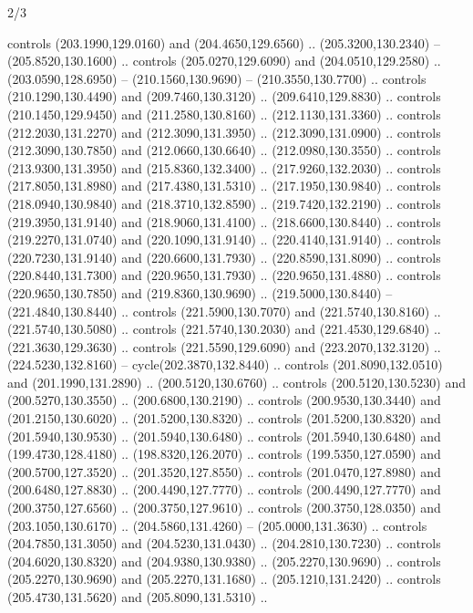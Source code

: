 \begin{flagdescription}{2/3}
\begin{scope}[xshift=0.5\flaglength,yshift=0.5\flagwidth,scale=\flagwidth/259.2]
\begin{scope}[y=0.8pt, x=0.8pt, yscale=-1,shift={(-243,-162)}]
      controls (203.1990,129.0160) and (204.4650,129.6560) .. (205.3200,130.2340) --
      (205.8520,130.1600) .. controls (205.0270,129.6090) and (204.0510,129.2580) ..
      (203.0590,128.6950) -- (210.1560,130.9690) -- (210.3550,130.7700) .. controls
      (210.1290,130.4490) and (209.7460,130.3120) .. (209.6410,129.8830) .. controls
      (210.1450,129.9450) and (211.2580,130.8160) .. (212.1130,131.3360) .. controls
      (212.2030,131.2270) and (212.3090,131.3950) .. (212.3090,131.0900) .. controls
      (212.3090,130.7850) and (212.0660,130.6640) .. (212.0980,130.3550) .. controls
      (213.9300,131.3950) and (215.8360,132.3400) .. (217.9260,132.2030) .. controls
      (217.8050,131.8980) and (217.4380,131.5310) .. (217.1950,130.9840) .. controls
      (218.0940,130.9840) and (218.3710,132.8590) .. (219.7420,132.2190) .. controls
      (219.3950,131.9140) and (218.9060,131.4100) .. (218.6600,130.8440) .. controls
      (219.2270,131.0740) and (220.1090,131.9140) .. (220.4140,131.9140) .. controls
      (220.7230,131.9140) and (220.6600,131.7930) .. (220.8590,131.8090) .. controls
      (220.8440,131.7300) and (220.9650,131.7930) .. (220.9650,131.4880) .. controls
      (220.9650,130.7850) and (219.8360,130.9690) .. (219.5000,130.8440) --
      (221.4840,130.8440) .. controls (221.5900,130.7070) and (221.5740,130.8160) ..
      (221.5740,130.5080) .. controls (221.5740,130.2030) and (221.4530,129.6840) ..
      (221.3630,129.3630) .. controls (221.5590,129.6090) and (223.2070,132.3120) ..
      (224.5230,132.8160) -- cycle(202.3870,132.8440) .. controls
      (201.8090,132.0510) and (201.1990,131.2890) .. (200.5120,130.6760) .. controls
      (200.5120,130.5230) and (200.5270,130.3550) .. (200.6800,130.2190) .. controls
      (200.9530,130.3440) and (201.2150,130.6020) .. (201.5200,130.8320) .. controls
      (201.5200,130.8320) and (201.5940,130.9530) .. (201.5940,130.6480) .. controls
      (201.5940,130.6480) and (199.4730,128.4180) .. (198.8320,126.2070) .. controls
      (199.5350,127.0590) and (200.5700,127.3520) .. (201.3520,127.8550) .. controls
      (201.0470,127.8980) and (200.6480,127.8830) .. (200.4490,127.7770) .. controls
      (200.4490,127.7770) and (200.3750,127.6560) .. (200.3750,127.9610) .. controls
      (200.3750,128.0350) and (203.1050,130.6170) .. (204.5860,131.4260) --
      (205.0000,131.3630) .. controls (204.7850,131.3050) and (204.5230,131.0430) ..
      (204.2810,130.7230) .. controls (204.6020,130.8320) and (204.9380,130.9380) ..
      (205.2270,130.9690) .. controls (205.2270,130.9690) and (205.2270,131.1680) ..
      (205.1210,131.2420) .. controls (205.4730,131.5620) and (205.8090,131.5310) ..

\end{scope}
\end{scope}
\end{flagdescription}
